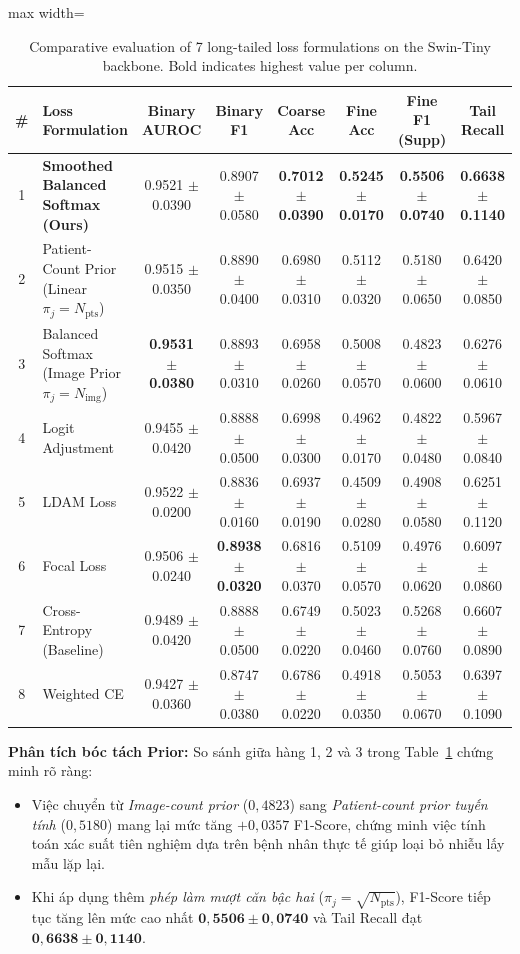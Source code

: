 \documentclass[runningheads]{llncs}
\begin{document}
\begin{table}[t]
\centering
\caption{Comparative evaluation of 7 long-tailed loss formulations on the Swin-Tiny backbone. Bold indicates highest value per column.}
\label{tab:stage20_loss}
\begin{adjustbox}{max width=\textwidth}
\begin{tabular}{clcccccc}
\toprule
\textbf{\#} & \textbf{Loss Formulation} & \textbf{Binary AUROC} & \textbf{Binary F1} & \textbf{Coarse Acc} & \textbf{Fine Acc} & \textbf{Fine F1 (Supp)} & \textbf{Tail Recall} \\
\midrule
1 & \textbf{Smoothed Balanced Softmax (Ours)} & 0.9521 $\pm$ 0.0390 & 0.8907 $\pm$ 0.0580 & \textbf{0.7012 $\pm$ 0.0390} & \textbf{0.5245 $\pm$ 0.0170} & \textbf{0.5506 $\pm$ 0.0740} & \textbf{0.6638 $\pm$ 0.1140} \\
2 & Patient-Count Prior (Linear $\pi_j = N_{\text{pts}}$) & 0.9515 $\pm$ 0.0350 & 0.8890 $\pm$ 0.0400 & 0.6980 $\pm$ 0.0310 & 0.5112 $\pm$ 0.0320 & 0.5180 $\pm$ 0.0650 & 0.6420 $\pm$ 0.0850 \\
3 & Balanced Softmax (Image Prior $\pi_j = N_{\text{img}}$) & \textbf{0.9531 $\pm$ 0.0380} & 0.8893 $\pm$ 0.0310 & 0.6958 $\pm$ 0.0260 & 0.5008 $\pm$ 0.0570 & 0.4823 $\pm$ 0.0600 & 0.6276 $\pm$ 0.0610 \\
4 & Logit Adjustment & 0.9455 $\pm$ 0.0420 & 0.8888 $\pm$ 0.0500 & 0.6998 $\pm$ 0.0300 & 0.4962 $\pm$ 0.0170 & 0.4822 $\pm$ 0.0480 & 0.5967 $\pm$ 0.0840 \\
5 & LDAM Loss & 0.9522 $\pm$ 0.0200 & 0.8836 $\pm$ 0.0160 & 0.6937 $\pm$ 0.0190 & 0.4509 $\pm$ 0.0280 & 0.4908 $\pm$ 0.0580 & 0.6251 $\pm$ 0.1120 \\
6 & Focal Loss & 0.9506 $\pm$ 0.0240 & \textbf{0.8938 $\pm$ 0.0320} & 0.6816 $\pm$ 0.0370 & 0.5109 $\pm$ 0.0570 & 0.4976 $\pm$ 0.0620 & 0.6097 $\pm$ 0.0860 \\
7 & Cross-Entropy (Baseline) & 0.9489 $\pm$ 0.0420 & 0.8888 $\pm$ 0.0500 & 0.6749 $\pm$ 0.0220 & 0.5023 $\pm$ 0.0460 & 0.5268 $\pm$ 0.0760 & 0.6607 $\pm$ 0.0890 \\
8 & Weighted CE & 0.9427 $\pm$ 0.0360 & 0.8747 $\pm$ 0.0380 & 0.6786 $\pm$ 0.0220 & 0.4918 $\pm$ 0.0350 & 0.5053 $\pm$ 0.0670 & 0.6397 $\pm$ 0.1090 \\
\bottomrule
\end{tabular}
\end{adjustbox}
\end{table}

\textbf{Phân tích bóc tách Prior:} So sánh giữa hàng 1, 2 và 3 trong Table~\ref{tab:stage20_loss} chứng minh rõ ràng:
\begin{itemize}
    \item Việc chuyển từ \textit{Image-count prior} ($0{,}4823$) sang \textit{Patient-count prior tuyến tính} ($0{,}5180$) mang lại mức tăng $+0{,}0357$ F1-Score, chứng minh việc tính toán xác suất tiên nghiệm dựa trên bệnh nhân thực tế giúp loại bỏ nhiễu lấy mẫu lặp lại.
    \item Khi áp dụng thêm \textit{phép làm mượt căn bậc hai} ($\pi_j = \sqrt{N_{\text{pts}}}$), F1-Score tiếp tục tăng lên mức cao nhất $\mathbf{0{,}5506 \pm 0{,}0740}$ và Tail Recall đạt $\mathbf{0{,}6638 \pm 0{,}1140}$.
\end{itemize}
\end{document}
